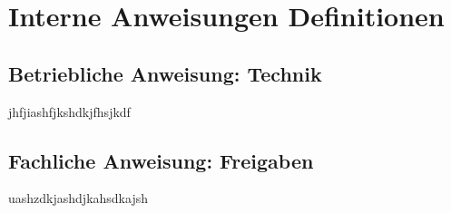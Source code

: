 \chapter{Interne Anweisungen Definitionen}

\section{Betriebliche Anweisung: Technik}
\label{ba_technik}

jhfjiashfjkshdkjfhsjkdf


\section{Fachliche Anweisung: Freigaben}
\label{fa_freigaben}

uashzdkjashdjkahsdkajsh 



